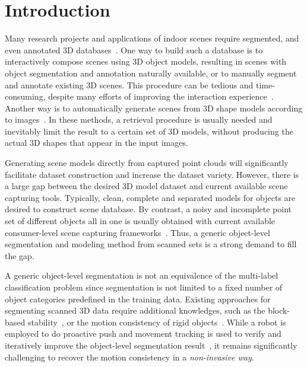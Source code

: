 \section{Introduction}
\label{sec:intro}
Many research projects and applications of indoor scenes require segmented, and even annotated 3D databases~\cite{SearchClassify,SceneFromExample,Fisher:2012:ESO:2366145.2366154,Chen:2014:ASM:2661229.2661239,Fisher:ActivityCentricSceneSynthesis}.
One way to build such a database is to interactively compose scenes using 3D object models, resulting in scenes with object segmentation and annotation naturally available, or to manually segment and annotate existing 3D scenes. This procedure can be tedious and time-consuming, despite many efforts of improving the interaction experience~\cite{Merrell:2011:IFL:2010324.1964982, Xu:2013:SSC:2461912.2461968}. Another way is to automatically generate scenes from 3D shape models according to images~\cite{Liu2015Model,Chen:2014:ASM:2661229.2661239}. In these methods, a retrieval procedure is usually needed and inevitably limit the result to a certain set of 3D models, without producing the actual 3D shapes that appear in the input images.

Generating scene models directly from captured point clouds will significantly facilitate dataset construction and increase the dataset variety. However, there is a large gap between the desired 3D model dataset and current available scene capturing tools. Typically, clean, complete and separated models for objects are desired to construct scene database. By contrast, a noisy and incomplete point set of different objects all in one is usually obtained with current available consumer-level scene capturing frameworks~\cite{KinectFusion, dai2016bundlefusion}. Thus, a generic object-level segmentation and modeling method from scanned sets is a strong demand to fill the gap.

A generic object-level segmentation is not an equivalence of the multi-label classification problem since segmentation is not limited to a fixed number of object categories predefined in the training data. 
Existing approaches for segmenting scanned 3D data require additional knowledges, such as the block-based stability~\cite{3DReasoningfromBlockstoStability}, or the motion consistency of rigid objects~\cite{Xu:2015:ACS:2816795.2818075}. 
While a robot is employed to do proactive push and movement tracking is used to verify and iteratively improve the object-level segmentation result~\cite{Xu:2015:ACS:2816795.2818075}, it remains significantly challenging to recover the motion consistency in a \emph{non-invasive way}. 

